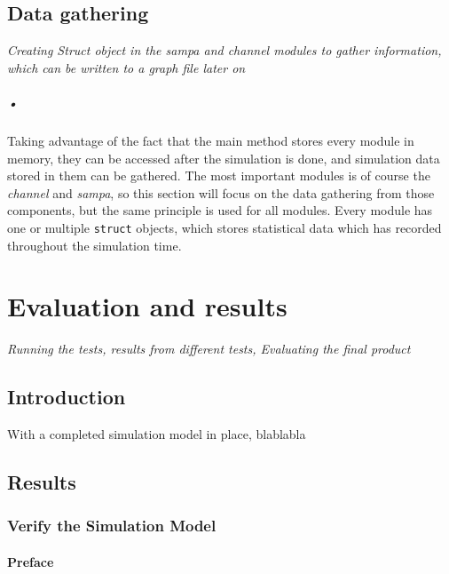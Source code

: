 \documentclass[a4paper, 12pt]{report}\dfrac{\right }{•}
\newcommand{\codeword}[1]{\texttt{#1}}
\begin{document}
\begin{minipage}{\linewidth}

\end{minipage}

\section{Data gathering}
\textit{Creating Struct object in the sampa and channel modules to gather information, which can be written to a graph file later on}

\paragraph{•}
Taking advantage of the fact that the main method stores every module in memory, they can be accessed after the simulation is done, and simulation data stored in them can be gathered.
The most important modules is of course the \textit{channel} and \textit{\gls{sampa}}, so this section will focus on the data gathering from those components, but the same principle is used for all modules.
Every module has one or multiple \codeword{struct} objects, which stores statistical data which has recorded throughout the simulation time.


\chapter{Evaluation and results}
\textit{Running the tests, results from different tests, Evaluating the final product}

\section{Introduction}
With a completed simulation model in place, blablabla

\section{Results}

\subsection{Verify the Simulation Model}

\subsubsection{Preface}
\end{document}
